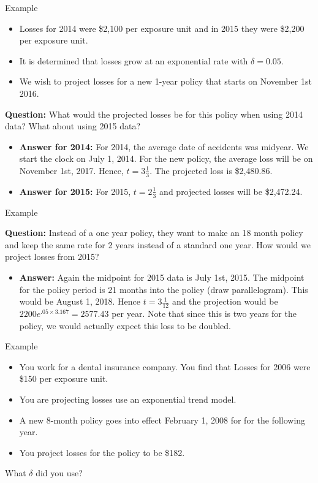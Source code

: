 \documentclass[compress,mathserif]{beamer}
\begin{document}
\begin{frame}{Example}
    \begin{itemize}
        \item Losses for 2014 were \$2,100 per exposure unit and in 2015 they were \$2,200 per exposure unit.
        \item It is determined that losses grow at an exponential rate with $\delta = 0.05$.
        \item We wish to project losses for a new 1-year policy that starts on November 1st 2016.
    \end{itemize}

    \textbf{Question:} What would the projected losses be for this policy when using 2014 data? What about using  2015 data?

    \begin{itemize}
        \item \textbf{Answer for 2014:} For 2014, the average date of accidents was midyear. We start the clock on July 1, 2014. For the new policy, the average loss will be on November 1st, 2017. Hence, $t = 3 \frac{1}{3}$. The projected loss is \$2,480.86.
        \item \textbf{Answer for 2015:} For 2015, $t = 2\frac{1}{3}$ and projected losses will be \$2,472.24.
    \end{itemize}
\end{frame}

\begin{frame}{Example}
 
    \textbf{Question:} Instead of a one year policy, they want to make an 18 month policy and keep the same rate for 2 years instead of a standard one year. How would we project losses from 2015?

    \begin{itemize}
        \item \textbf{Answer:}  Again the midpoint for 2015 data is July 1st, 2015. The midpoint for the policy period is 21 months into the policy (draw parallelogram). This would be August 1, 2018. Hence $t = 3\frac{1}{12}$ and the projection would be $2200 e^{.05\times 3.167} = 2577.43$ per year. Note that since this is two years for the policy, we would actually expect this loss to be doubled. 
    \end{itemize}
\end{frame}

\begin{frame}{Example}
    \begin{itemize}
        \item You work for a dental insurance company. You find that Losses for 2006 were \$150 per exposure unit. 
        \item You are projecting losses use an exponential trend model.
        \item A new 8-month policy goes into effect February 1, 2008 for for the following year. 
        \item You project losses for the policy to be \$182. 
    \end{itemize}
    What $\delta$ did you use?
\end{frame}
\end{document}
